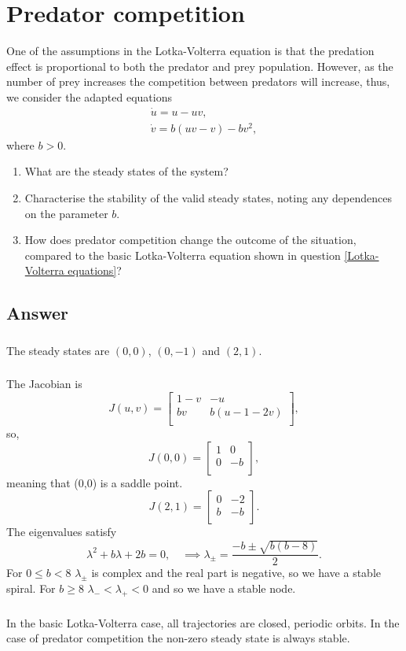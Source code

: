 \documentclass[]{article}
\newcommand{\bb}{\begin{equation}}
\newcommand{\ee}{\end{equation}}
\begin{document}
\section{Predator competition}
One of the assumptions in the Lotka-Volterra equation is that the predation effect is proportional to both the predator and prey population. However, as the number of prey increases the  competition between predators will increase, thus, we consider the adapted equations
\begin{align}
\dot{u}=u-uv,\\
\dot{v}=b(uv-v)-bv^2,
\end{align}
where $b>0$.
\begin{enumerate}
\item What are the steady states of the system?
\item Characterise the stability of the valid steady states, noting any dependences on the parameter $b$.
\item How does predator competition change the outcome of the situation, compared to the basic Lotka-Volterra equation shown in question \ref{Lotka-Volterra equations}?
\end{enumerate}
\begin{Answ}
\subsection{Answer}
\subsubsection{}
The steady states are $(0,0)$, $(0,-1)$ and $(2,1)$.
\subsubsection{}
The Jacobian is
\bb
J(u,v)=\left[ {\begin{array}{cc}
   1-v & -u \\
   bv & b(u-1-2v) \\
  \end{array} } \right],
\ee
so, 
\bb
J(0,0)=\left[ {\begin{array}{cc}
   1 & 0 \\
   0 & -b \\
  \end{array} } \right],
\ee
meaning that (0,0) is a saddle point.
\bb
J(2,1)=\left[ {\begin{array}{cc}
   0 & -2 \\
   b & -b \\
  \end{array} } \right].
\ee
The eigenvalues satisfy
\bb
\lambda^2+b\lambda+2b=0,\quad\implies\lambda_\pm=\frac{-b\pm\sqrt{b(b-8)}}{2}.
\ee
For $0\leq b < 8$ $\lambda_\pm$ is complex and the real part is negative, so we have a stable spiral. For $b\geq 8$ $\lambda_-<\lambda_+<0$ and so we have a stable node.
\subsubsection{}
In the basic Lotka-Volterra case, all trajectories are closed, periodic orbits. In the case of predator competition the non-zero steady state is always stable.
\end{Answ}
\end{document}
